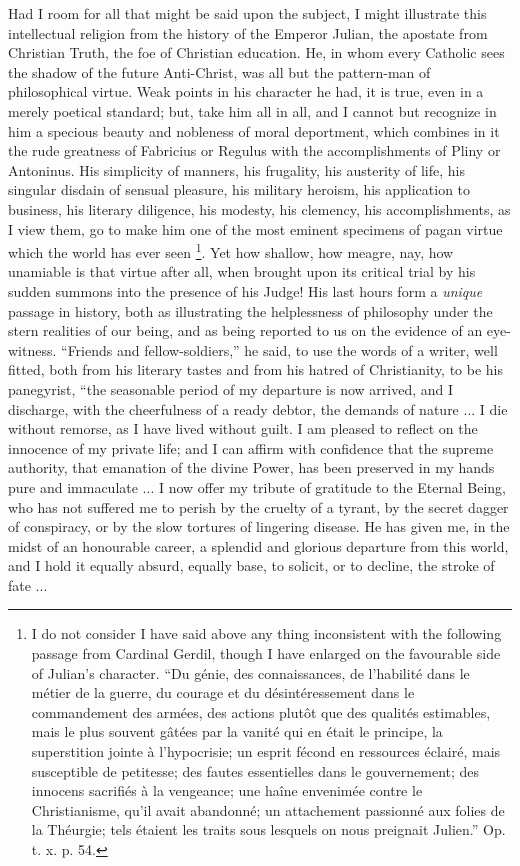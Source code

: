 Had I room for all that might be said upon the subject, I might
illustrate this intellectual religion from the history of the Emperor
Julian, the apostate from Christian Truth, the foe of Christian
education. He, in whom every Catholic sees the shadow of the future
Anti-Christ, was all but the pattern-man of philosophical virtue. Weak
points in his character he had, it is true, even in a merely poetical
standard; but, take him all in all, and I cannot but recognize in him
a specious beauty and nobleness of moral deportment, which combines in
it the rude greatness of Fabricius or Regulus with the accomplishments
of Pliny or Antoninus. His simplicity of manners, his frugality, his
austerity of life, his singular disdain of sensual pleasure, his
military heroism, his application to business, his literary diligence,
his modesty, his clemency, his accomplishments, as I view them, go to
make him one of the most eminent specimens of pagan virtue which the
world has ever seen \footnote{I do not consider I have said above any thing inconsistent with
the following passage from Cardinal Gerdil, though I have enlarged on
the favourable side of Julian's character. ``Du génie, des
connaissances, de l'habilité dans le métier de la guerre, du courage
et du désintéressement dans le commandement des armées, des actions
plutôt que des qualités estimables, mais le plus souvent gâtées
par la vanité qui en était le principe, la superstition jointe à l'hypocrisie;
un esprit fécond en ressources éclairé, mais susceptible de
petitesse; des fautes essentielles dans le gouvernement; des innocens
sacrifiés à la vengeance; une haîne envenimée contre le
Christianisme, qu'il avait abandonné; un attachement passionné aux
folies de la Théurgie; tels étaient les traits sous lesquels on nous
preignait Julien.'' Op. t. x. p. 54.}.
Yet how shallow, how meagre, nay, how unamiable is that virtue after
all, when brought upon its critical trial by his sudden summons into
the presence of his Judge! His last hours form a \emph{unique} passage
in history, both as illustrating the helplessness of philosophy under
the stern realities of our being, and as being reported to us on
the evidence of an eye-witness. ``Friends and
fellow-soldiers,'' he said, to use the words of a writer, well
fitted, both from his literary tastes and from his hatred of
Christianity, to be his panegyrist, ``the seasonable period of my
departure is now arrived, and I discharge, with the cheerfulness of a
ready debtor, the demands of nature ... I die without remorse, as I
have lived without guilt. I am pleased to reflect on the innocence of
my private life; and I can affirm with confidence that the supreme
authority, that emanation of the divine Power, has been preserved in
my hands pure and immaculate ... I now offer my tribute of gratitude
to the Eternal Being, who has not suffered me to perish by the cruelty
of a tyrant, by the secret dagger of conspiracy, or by the slow
tortures of lingering disease. He has given me, in the midst of an
honourable career, a splendid and glorious departure from this world,
and I hold it equally absurd, equally base, to solicit, or to decline,
the stroke of fate ...

